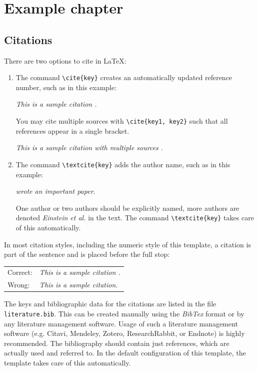 \chapter{Example chapter}
{
    \color{orange}
    
    \section*{Citations}
    There are two options to cite in \LaTeX:
    
    \begin{enumerate}
    	\item The command \verb!\cite{key}! creates an automatically updated reference number, such as in this example: 
        \begin{center}
            \emph{This is a sample citation \cite{Einstein1905}.}
        \end{center}
        You may cite multiple sources with \verb!\cite{key1, key2}! such that all references appear in a single bracket.
        \begin{center}
            \emph{This is a sample citation with multiple sources \cite{Einstein1905, Darwin1859}}.
        \end{center}
    	\item The command \verb!\textcite{key}! adds the author name, such as in this example: 
     \begin{center}
         \emph{\textcite{Einstein1905} wrote an important paper}.
     \end{center} 
     One author or two authors should be explicitly named, more authors are denoted \emph{Einstein et al.} in the text. The command \verb!\textcite{key}! takes care of this automatically.
    \end{enumerate}

    In most citation styles, including the numeric style of this template, a citation is part of the sentence and is placed before the full stop:
    \begin{center}
        \begin{tabular}{ll}
            Correct: & \emph{This is a sample citation \cite{Einstein1905}.} \\
            Wrong: & \emph{This is a sample citation. \cite{Einstein1905}}
        \end{tabular}
    \end{center}

    The keys and bibliographic data for the citations are listed in the file \texttt{literature.bib}. This can be created manually using the \emph{BibTex} format or by any literature management software. Usage of such a literature management software (e.g. Citavi, Mendeley, Zotero, ResearchRabbit, or Endnote) is highly recommended.
    The bibliography should contain just references, which are actually used and referred to. In the default configuration of this template, the template takes care of this automatically. 

}
